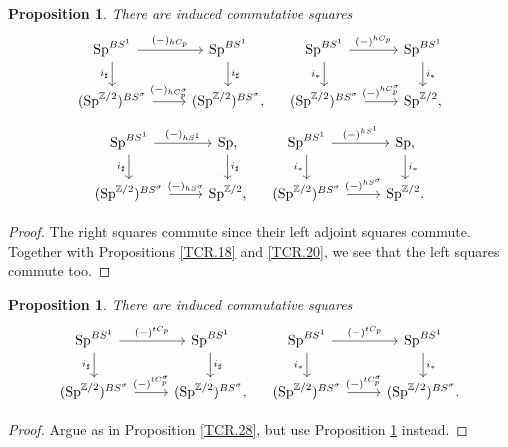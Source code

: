 \documentclass[10pt]{amsart}
\newtheorem{prop}[thm]{Proposition}
\theoremstyle{definition}
\theoremstyle{remark}
\numberwithin{equation}{section}
\newcommand{\Z}{\mathbb{Z}}
\newcommand{\Sp}{\mathrm{Sp}}
\begin{document}
\begin{prop}
\label{TCR.21}
There are induced commutative squares
\[
\begin{tikzcd}
\Sp^{BS^1}\ar[r,"(-)_{hC_p}"]\ar[d,"i_\sharp"']&
\Sp^{BS^1}\ar[d,"i_\sharp"]
\\
(\Sp^{\Z/2})^{BS^\sigma}
\ar[r,"(-)_{hC_p^\sigma}"]&
(\Sp^{\Z/2})^{BS^\sigma},
\end{tikzcd}
\quad
\begin{tikzcd}
\Sp^{BS^1}\ar[r,"(-)^{hC_p}"]\ar[d,"i_*"']&
\Sp^{BS^1}\ar[d,"i_*"]
\\
(\Sp^{\Z/2})^{BS^\sigma}
\ar[r,"(-)^{hC_p^\sigma}"]&
\Sp^{\Z/2},
\end{tikzcd}
\]
\[
\begin{tikzcd}
\Sp^{BS^1}\ar[r,"(-)_{hS^1}"]\ar[d,"i_\sharp"']&
\Sp\ar[d,"i_\sharp"],
\\
(\Sp^{\Z/2})^{BS^\sigma}
\ar[r,"(-)_{hS^\sigma}"]&
\Sp^{\Z/2},
\end{tikzcd}
\quad
\begin{tikzcd}
\Sp^{BS^1}\ar[r,"(-)^{hS^1}"]\ar[d,"i_*"']&
\Sp\ar[d,"i_*"],
\\
(\Sp^{\Z/2})^{BS^\sigma}
\ar[r,"(-)^{hS^\sigma}"]&
\Sp^{\Z/2}.
\end{tikzcd}
\]
\end{prop}
\begin{proof}
The right squares commute since their left adjoint squares commute.
Together with Propositions \ref{TCR.18} and \ref{TCR.20},
we see that the left squares commute too.
\end{proof}

\begin{prop}
\label{TCR.29}
There are induced commutative squares
\[
\begin{tikzcd}
\Sp^{BS^1}\ar[r,"(-)^{tC_p}"]\ar[d,"i_\sharp"']&
\Sp^{BS^1}\ar[d,"i_\sharp"]
\\
(\Sp^{\Z/2})^{BS^\sigma}
\ar[r,"(-)^{tC_p^\sigma}"]&
(\Sp^{\Z/2})^{BS^\sigma},
\end{tikzcd}
\quad
\begin{tikzcd}
\Sp^{BS^1}\ar[r,"(-)^{tC_p}"]\ar[d,"i_*"']&
\Sp^{BS^1}\ar[d,"i_*"]
\\
(\Sp^{\Z/2})^{BS^\sigma}
\ar[r,"(-)^{tC_p^\sigma}"]&
(\Sp^{\Z/2})^{BS^\sigma}.
\end{tikzcd}
\]
\end{prop}
\begin{proof}
Argue as in Proposition \ref{TCR.28}, but use Proposition \ref{TCR.21} instead.
\end{proof}
\end{document}
